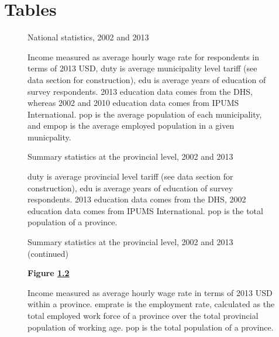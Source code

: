 \chapter{Tables}
\label{sec:Tables}
\fontsize{10pt}{12pt}\selectfont

\begin{figure}[H]
\begin{center}
National statistics, 2002 and 2013


\caption{\label{fig:Summary 1}}
\end{center}
Income measured
as average hourly wage rate for respondents in terms of 2013 USD, 
duty is average municipality level tariff (see data
section for construction), edu is average years of education of survey respondents. 
2013 education data comes from the DHS, whereas 2002 and 2010 education data comes
from IPUMS International. pop is the average population of each municipality,
and empop is the average employed population in a given municpality.
\end{figure}

\begin{figure}[H]
\begin{center}
Summary statistics at the provincial level, 2002 and 2013

\caption{\label{fig:Summary 2}}
\end{center}
duty is average provincial level tariff (see data
section for construction), edu is average years of education of survey respondents. 
2013 education data comes from the DHS, 2002 education data comes
from IPUMS International. pop is the total population of a province.
\end{figure}

\begin{figure}[H]
\begin{center}
Summary statistics at the provincial level, 2002 and 2013 (continued)


\vspace{15pt} \textbf{Figure \ref{fig:Summary 2}}
\end{center}
Income measured
as average hourly wage rate in terms of 2013 USD within a province.
emprate is the employment rate, calculated as the total employed work force of a province
over the total provincial population of working age.
pop is the total population of a province.
\end{figure}

